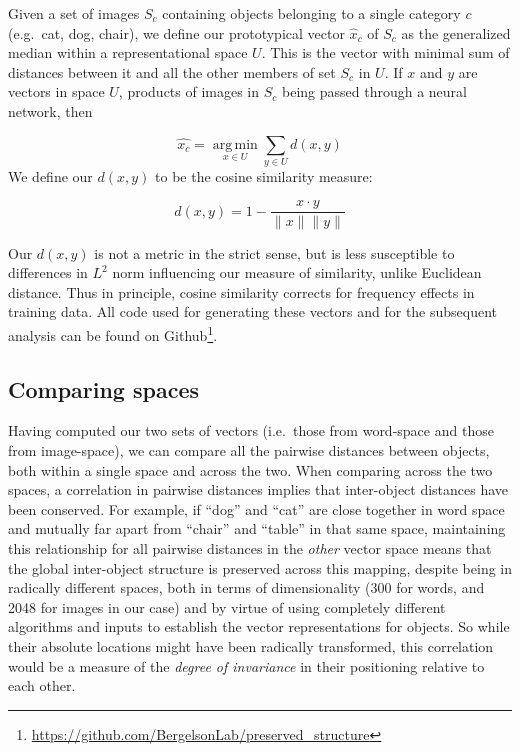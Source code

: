 \documentclass[10pt, letterpaper]{article}
\begin{document}
Given a set of images \(S_c\) containing objects belonging to a single
category \(c\) (e.g.~cat, dog, chair), we define our prototypical vector
\(\hat{x}_c\) of \(S_c\) as the generalized median within a
representational space \(U\). This is the vector with minimal sum of
distances between it and all the other members of set \(S_c\) in \(U\).
If \(x\) and \(y\) are vectors in space \(U\), products of images in
\(S_c\) being passed through a neural network, then

\[
 \hat{x_c} = \operatorname*{arg\,min}_{x\in U} \sum_{y\in U} d(x, y)
\] We define our \(d(x, y)\) to be the cosine similarity measure:

\[
d(x, y) = 1 - \frac{x\cdot y}{\|x\|\|y\|}
\]

Our \(d(x, y)\) is not a metric in the strict sense, but is less
susceptible to differences in \(L^2\) norm influencing our measure of
similarity, unlike Euclidean distance. Thus in principle, cosine
similarity corrects for frequency effects in training data. All code
used for generating these vectors and for the subsequent analysis can be
found on
Github\footnote{\url{https://github.com/BergelsonLab/preserved_structure}}.

\subsection{Comparing spaces}\label{comparing-spaces}

Having computed our two sets of vectors (i.e.~those from word-space and
those from image-space), we can compare all the pairwise distances
between objects, both within a single space and across the two. When
comparing across the two spaces, a correlation in pairwise distances
implies that inter-object distances have been conserved. For example, if
``dog'' and ``cat'' are close together in word space and mutually far
apart from ``chair'' and ``table'' in that same space, maintaining this
relationship for all pairwise distances in the \textit{other} vector
space means that the global inter-object structure is preserved across
this mapping, despite being in radically different spaces, both in terms
of dimensionality (300 for words, and 2048 for images in our case) and
by virtue of using completely different algorithms and inputs to
establish the vector representations for objects. So while their
absolute locations might have been radically transformed, this
correlation would be a measure of the \textit{degree of invariance} in
their positioning relative to each other.
\end{document}
